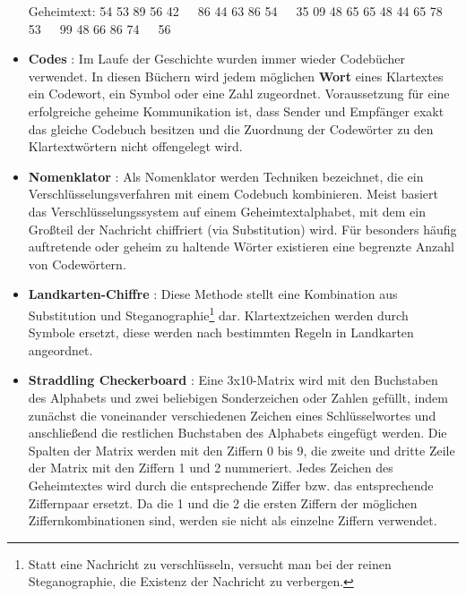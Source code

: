 \begin{refsegment}
\begin{itemize}
\begin{table}[ht]
   \end{table}%
	
   Geheimtext:
   54 53 89 56 42~~~86 44 63 86 54~~~35 09 48 65 65
   48 44 65 78 53~~~99 48 66 86 74~~~56\\


\item \textbf{Codes} \cite{Singh2001}: Im Laufe der Geschichte wurden immer
   wieder Codebücher verwendet. In diesen Büchern wird jedem möglichen
   \textbf{Wort} eines Klartextes ein Codewort, ein Symbol oder eine Zahl
   zugeordnet.
   Voraussetzung für eine erfolgreiche geheime Kommunikation ist, dass
   Sender und Empfänger exakt das gleiche Codebuch besitzen und die
   Zuordnung der Codewörter zu den Klartextwörtern nicht offengelegt wird.

\item \textbf{Nomenklator} \cite{Singh2001}:
   Als Nomenklator werden Techniken bezeichnet, die ein Verschlüsselungsverfahren
   mit einem Codebuch kombinieren. Meist basiert das Verschlüsselungssystem auf
   einem Geheimtextalphabet, mit dem ein Großteil der Nachricht chiffriert
   (via Substitution) wird. Für besonders häufig auftretende oder
   geheim zu haltende Wörter existieren eine begrenzte Anzahl von Codewörtern.

\item \textbf{Landkarten-Chiffre} \cite{ThinkQuest1999}:
   Diese Methode stellt eine Kombination aus
   Substitution und Steganographie\footnote{Statt eine Nachricht zu
   verschlüsseln, versucht man bei der reinen
   Steganographie, die Existenz
   der Nachricht zu verbergen.} dar.
   Klartextzeichen werden durch Symbole ersetzt, diese werden nach bestimmten
   Regeln in Landkarten angeordnet.


\item \textbf{Straddling Checkerboard}
   \cite{Goebel2014}:
   Eine 3x10-Matrix wird
   mit den Buchstaben des Alphabets und zwei beliebigen Sonderzeichen oder
   Zahlen gefüllt, indem zunächst die voneinander verschiedenen Zeichen
   eines Schlüsselwortes und anschließend die restlichen Buchstaben des
   Alphabets eingefügt werden. Die Spalten der Matrix werden mit den Ziffern
   0 bis 9, die zweite und dritte Zeile der Matrix mit den Ziffern 1 und 2
   nummeriert. Jedes Zeichen des Geheimtextes wird durch die entsprechende
   Ziffer bzw. das entsprechende Ziffernpaar ersetzt. Da die 1 und die 2
   die ersten Ziffern der möglichen Ziffernkombinationen sind, werden
   sie nicht als einzelne Ziffern verwendet.


\end{itemize}
\end{refsegment}
